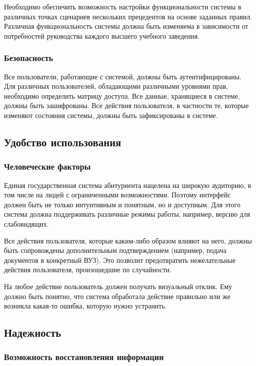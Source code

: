\documentclass[a4paper, 14pt]{extarticle}
\begin{document}
Необходимо обеспечить возможность настройки функциональности системы в различных
точках сценариев нескольких прецедентов на основе заданных правил. Различная
функциональность системы должна быть изменяема в зависимости от потребностей
руководства каждого высшего учебного заведения.

\subsubsection*{Безопасность}

Все пользователи, работающие с системой, должны быть аутентифицированы. Для
различных пользователей, обладающими различными уровнями прав, необходимо
определить матрицу доступа. Все данные, хранящиеся в системе, должны быть
зашифрованы. Все действия пользователя, в частности те, которые изменяют
состояния системы, должны быть зафиксированы в системе.

\subsection*{Удобство использования}

\subsubsection*{Человеческие факторы}

Единая государственная система абитуриента нацелена на широкую аудиторию, в том
числе на людей с ограниченными возможностями. Поэтому интерфейс должен быть не
только интуитивным и понятным, но и доступным. Для этого система должна
поддерживать различные режимы работы, например, версию для слабовидящих.

Все действия пользователя, которые каким-либо образом влияют на него, должны
быть сопровождены дополнительным подтверждением (например, подача документов в
конкретный ВУЗ). Это позволит предотвратить нежелательные действия пользователя,
произошедшие по случайности.

На любое действие пользователь должен получать визуальный отклик. Ему должно
быть понятно, что система обработала действие правильно или же возникла какая-то
ошибка, которую нужно устранить.

\subsection*{Надежность}

\subsubsection*{Возможность восстановления информации}
\end{document}
